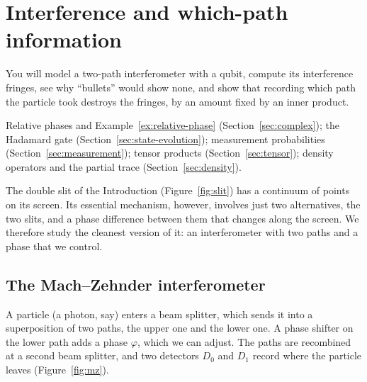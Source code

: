 \section{Interference and which-path information}\label{sec:interference}

\begin{objectives}
  You will model a two-path interferometer with a qubit, compute its interference fringes, see why ``bullets'' would show none, and show that recording which path the particle took destroys the fringes, by an amount fixed by an inner product.
\end{objectives}

\begin{recall}
  Relative phases and Example~\ref{ex:relative-phase} (Section~\ref{sec:complex}); the Hadamard gate (Section~\ref{sec:state-evolution}); measurement probabilities (Section~\ref{sec:measurement}); tensor products (Section~\ref{sec:tensor}); density operators and the partial trace (Section~\ref{sec:density}).
\end{recall}

The double slit of the Introduction (Figure~\ref{fig:slit}) has a continuum of points on its screen. Its essential mechanism, however, involves just two alternatives, the two slits, and a phase difference between them that changes along the screen. We therefore study the cleanest version of it: an interferometer with two paths and a phase that we control.

\subsection{The Mach--Zehnder interferometer}

A particle (a photon, say) enters a beam splitter, which sends it into a superposition of two paths, the upper one and the lower one. A phase shifter on the lower path adds a phase $\varphi$, which we can adjust. The paths are recombined at a second beam splitter, and two detectors $D_0$ and $D_1$ record where the particle leaves (Figure~\ref{fig:mz}).

